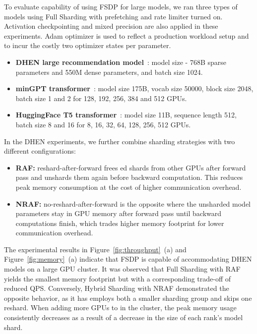 To evaluate capability of using FSDP for large models, we ran three types of models using Full Sharding with prefetching and rate limiter turned on. Activation checkpointing and  mixed precision are also applied in these experiments. Adam optimizer is used to reflect a production workload setup and to incur the costly two optimizer states per parameter.
\begin{itemize}
    \item \textbf{DHEN large recommendation model}~\cite{DHEN}: model size - 768B sparse parameters and 550M dense parameters, and batch size 1024. 
    \item \textbf{minGPT transformer}~\cite{MinGPT}: model size 175B, vocab size 50000, block size 2048, batch size 1 and 2 for 128, 192, 256, 384 and 512 GPUs.
    \item \textbf{HuggingFace T5 transformer}~\cite{raffel2020exploring}: model size 11B, sequence length 512, batch size 8 and 16 for 8, 16, 32, 64, 128, 256, 512 GPUs.
\end{itemize}

In the DHEN experiments, we further combine sharding strategies with two different configurations: 

\begin{itemize}
    \item \textbf{RAF:} reshard-after-forward frees ed shards from other GPUs after forward pass and unshards them again before backward computation. This reduces peak memory consumption at the cost of higher communication overhead.
    \item \textbf{NRAF:} no-reshard-after-forward is the opposite where the unsharded model parameters stay in GPU memory after forward pass until backward computations finish, which trades higher memory footprint for lower communication overhead.
\end{itemize}

The experimental results in Figure~\ref{fig:throughput}~(a) and Figure~\ref{fig:memory}~(a) indicate that FSDP is capable of accommodating DHEN models on a large GPU cluster. It was observed that Full Sharding with RAF yields the smallest memory footprint but with a corresponding trade-off of reduced QPS. Conversely, Hybrid Sharding with NRAF demonstrated the opposite behavior, as it has employs both a smaller sharding group and skips one reshard. When adding more GPUs to in the cluster, the peak memory usage consistently decreases as a result of a decrease in the size of each rank's model shard.

